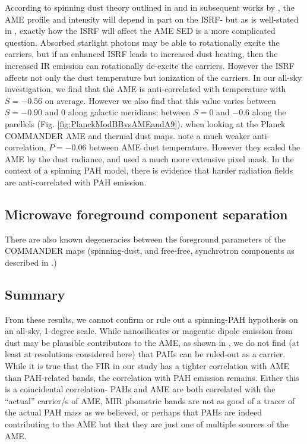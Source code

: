 \documentclass[preprint2,longabstract]{aastex}
\begin{document}
        According to spinning dust theory outlined in \cite{draine98a} and in subsequent works by \cite{ysard10a}, the AME profile and intensity will depend in part on the ISRF- but as is well-stated in \cite{hensley17a}, exactly how the ISRF will affect the AME SED is a more complicated question. Absorbed starlight photons may be able to rotationally excite the carriers, but if an enhanced ISRF leads to increased dust heating, then the increased IR emission can rotationally de-excite the carriers. However the ISRF affects not only the dust temperature but ionization of the carriers. In our all-sky investigation, we find that the AME is anti-correlated with temperature with $S = -0.56$ on average. However we also find that this value varies between $S = -0.90$ and $0$ along galactic meridians; between $S = 0$ and $-0.6$ along the parellels (Fig. \ref{fig:PlanckModBBvsAMEandA9}).  when looking at the Planck COMMANDER AME and thermal dust maps. \cite{hensley16} note a much weaker anti-correlation, $P = -0.06$ between AME dust temperature. However they scaled the AME by the dust radiance, and used a much more extensive pixel mask. In the context of a spinning PAH model, there is evidence that harder radiation fields are anti-correlated with PAH emission.


      \subsection{Microwave foreground component separation}

        There are also known degeneracies between the foreground parameters of the COMMANDER maps (spinning-dust, and free-free, synchrotron components as described in \cite{planck15X}.)

      \subsection{Summary}

        From these results, we cannot confirm or rule out a spinning-PAH hypothesis on an all-sky, 1-degree scale. While nanosilicates or magentic dipole emission from dust may be plausible contributors to the AME, as shown in \cite{hoang16a, hensley17a}, we do not find (at least at resolutions considered here) that PAHs can be ruled-out as a carrier. While it is true that the FIR in our study has a tighter correlation with AME than PAH-related bands, the correlation with PAH emission remains. Either this is a coincidental correlation- PAHs and AME are both correlated with the ``actual'' carrier/s of AME, MIR phometric bands are not as good of a tracer of the actual PAH mass as we believed, or perhaps that PAHs are indeed contributing to the AME but that they are just one of multiple sources of the AME.
\end{document}
